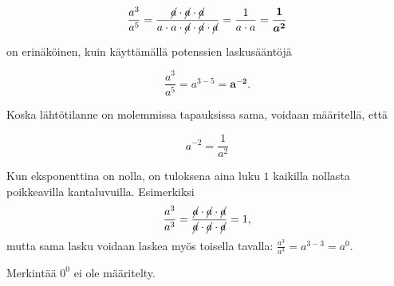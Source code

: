     \begin{equation*}
        \frac{a^3}{a^5} =
        \frac{\cancel{a}\cdot \cancel{a}\cdot \cancel{a}}{a\cdot a\cdot
        \cancel{a}\cdot \cancel{a}\cdot \cancel{a}} = 
        \frac{1}{a\cdot a}=\boldsymbol{\frac{1}{a^2}}
    \end{equation*}
    
    on erinäköinen, kuin käyttämällä potenssien laskusääntöjä
    
    \begin{equation*}
        \frac{a^3}{a^5} = a^{3-5}=\boldsymbol {a^{-2}}{.}
    \end{equation*}
    
    Koska lähtötilanne on molemmissa tapauksissa sama, voidaan määritellä, että
    
    \begin{equation*}
        a^{-2} = \frac{1}{a^2}
    \end{equation*}
  
    
    Kun eksponenttina on nolla, on tuloksena aina luku $1$ kaikilla nollasta poikkeavilla kantaluvuilla. 
    Esimerkiksi
    \[
        \frac{a^3}{a^3}=\frac{\cancel{a}\cdot \cancel{a}\cdot \cancel{a}}{\cancel{a}\cdot \cancel{a}\cdot \cancel{a}}=1,
    \]
    mutta sama lasku voidaan laskea myös toisella tavalla: $\frac{a^3}{a^3}=a^{3-3}=a^0$.
  

Merkintää $0^0$ ei ole määritelty.    

%    
%   

